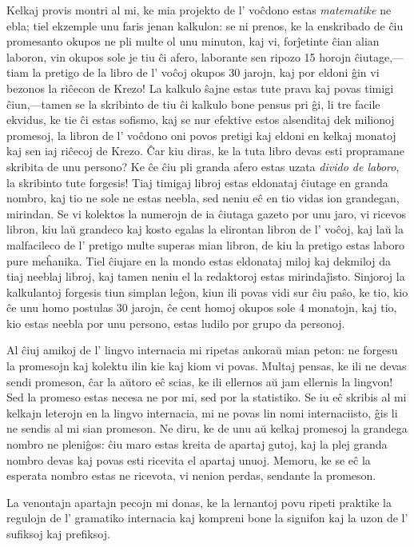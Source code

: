 Kelkaj provis montri al mi, ke mia projekto de l' voĉdono estas \emph{matematike} ne ebla; tiel ekzemple unu faris jenan kalkulon: \glqq{}se ni prenos, ke la enskribado de ĉiu promesanto okupos ne pli multe ol unu minuton, kaj vi, forĵetinte ĉian alian laboron, vin okupos sole je tiu ĉi afero, laborante sen ripozo 15 horojn ĉiutage,---tiam la pretigo de la libro de l' voĉoj okupos 30 jarojn, kaj por eldoni ĝin vi bezonos la riĉecon de Krezo!\grqq{} La kalkulo ŝajne estas tute prava kaj povas timigi ĉiun,---tamen se la skribinto de tiu ĉi kalkulo bone pensus pri ĝi, li tre facile ekvidus, ke tie ĉi estas sofismo, kaj se nur efektive estos alsenditaj dek milionoj promesoj, la libron de l' voĉdono oni povos pretigi kaj eldoni en kelkaj monatoj kaj sen iaj riĉecoj de Krezo. Ĉar kiu diras, ke la tuta libro devas esti propramane skribita de unu persono? Ke ĉe ĉiu pli granda afero estas uzata \emph{divido de laboro}, la skribinto tute forgesis! Tiaj \glqq{}timigaj\grqq{} libroj estas eldonataj ĉiutage en granda nombro, kaj tio ne sole ne estas neebla, sed neniu eĉ en tio vidas ion grandegan, mirindan. Se vi kolektos la numerojn de ia ĉiutaga gazeto por unu jaro, vi ricevos libron, kiu laŭ grandeco kaj kosto egalas la elirontan libron de l' voĉoj, kaj laŭ la malfacileco de l' pretigo multe superas mian libron, de kiu la pretigo estas laboro pure meĥanika. Tiel ĉiujare en la mondo estas eldonataj miloj kaj dekmiloj da tiaj \glqq{}neeblaj\grqq{} libroj, kaj tamen neniu el la redaktoroj estas mirindaĵisto. Sinjoroj la kalkulantoj forgesis tiun simplan leĝon, kiun ili povas vidi sur ĉiu paŝo, ke tio, kio ĉe unu homo postulas 30 jarojn, ĉe cent homoj okupos sole 4 monatojn, kaj tio, kio estas neebla por unu persono, estas ludilo por grupo da personoj.

Al ĉiuj amikoj de l' lingvo internacia mi ripetas ankoraŭ mian peton: ne forgesu la promesojn kaj kolektu ilin kie kaj kiom vi povas. Multaj pensas, ke ili ne devas sendi promeson, ĉar \glqq{}la aŭtoro eĉ scias, ke ili ellernos aŭ jam ellernis la lingvon\grqq{}! Sed la promeso estas necesa ne por mi, sed por la statistiko. Se iu eĉ skribis al mi kelkajn leterojn en la lingvo internacia, mi ne povas lin nomi internaciisto, ĝis li ne sendis al mi sian promeson. Ne diru, ke de unu aŭ kelkaj promesoj la grandega nombro ne pleniĝos: ĉiu maro estas kreita de apartaj gutoj, kaj la plej granda nombro devas kaj povas esti ricevita el apartaj unuoj. Memoru, ke se eĉ la esperata nombro estas ne ricevota, vi nenion perdas, sendante la promeson. 


La venontajn apartajn pecojn mi donas, ke la lernantoj povu ripeti praktike la regulojn de l' gramatiko internacia kaj kompreni bone la signifon kaj la uzon de l' sufiksoj kaj prefiksoj.
